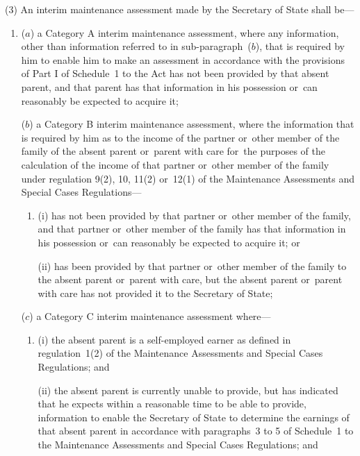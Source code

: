 \documentclass[a4paper,12pt]{article}
\begin{document}
(3) An interim maintenance assessment made by 
the Secretary of State  %
shall be—
\begin{enumerate}\item[]
($a$) a Category A interim maintenance assessment, where any information, other than information referred to in sub-paragraph~($b$), that is required by him to enable him to make an assessment in accordance with the provisions of Part I of Schedule~1 to the Act has not been provided by that absent parent, and that parent has that information in his possession or~can reasonably be expected to acquire it;

($b$) a Category B interim maintenance assessment, where the information that is required by him as to the income of the partner or~other member of the family of the absent parent or~parent with care for~the purposes of the calculation of the income of that partner or~other member of the family under regulation 9(2), 10, 11(2) or~12(1) of the Maintenance Assessments and Special Cases Regulations—
\begin{enumerate}\item[]
(i) has not been provided by that partner or~other member of the family, and that partner or~other member of the family has that information in his possession or~can reasonably be expected to acquire it; or

(ii) has been provided by that partner or~other member of the family to the absent parent or~parent with care, but the absent parent or~parent with care has not provided it to the Secretary of State;
\end{enumerate}

($c$) a Category C interim maintenance assessment where—
\begin{enumerate}\item[]
(i) the absent parent is a self-employed earner as defined in regulation~1(2) of the Maintenance Assessments and Special Cases Regulations; and

(ii) the absent parent is currently unable to provide, but has indicated that he expects within a reasonable time to be able to provide, information to enable 
the Secretary of State  %
to determine the earnings of that absent parent in accordance with paragraphs~3 to 5 of Schedule~1 to the Maintenance Assessments and Special Cases Regulations; and


\end{enumerate}
\end{enumerate}
\end{document}
